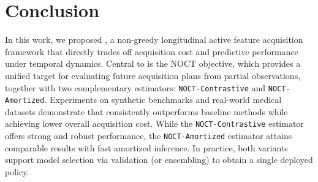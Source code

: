 \section{Conclusion}
\label{sec:conclusion}


In this work, we proposed \texttt{\OurMethod}, a non-greedy longitudinal active feature acquisition framework that directly trades off acquisition cost and predictive performance under temporal dynamics. Central to \texttt{\OurMethod} is the NOCT objective, which provides a unified target for evaluating future acquisition plans from partial observations, together with two complementary estimators: \texttt{NOCT-Contrastive} and \texttt{NOCT-Amortized}. Experiments on synthetic benchmarks and real-world medical datasets demonstrate that \texttt{\OurMethod} consistently outperforms baseline methods while achieving lower overall acquisition cost. While the \texttt{NOCT-Contrastive} estimator offers strong and robust performance, the \texttt{NOCT-Amortized} estimator attains comparable results with fast amortized inference. 
In practice, both variants support model selection via validation (or ensembling) to obtain a single deployed policy.


